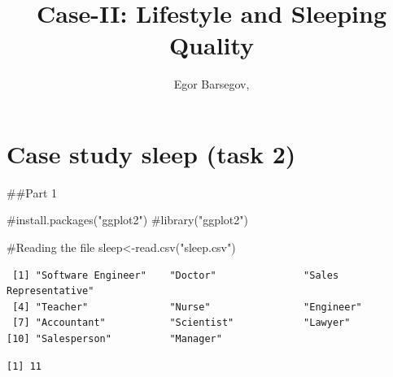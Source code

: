 \documentclass[
  letterpaper,
  DIV=11,
  numbers=noendperiod]{scrartcl}
\title{Case-II: Lifestyle and Sleeping Quality}
\author{Egor Barsegov,}
\date{}
\newenvironment{Shaded}{\begin{snugshade}}{\end{snugshade}}
\newcommand{\CommentTok}[1]{\textcolor[rgb]{0.37,0.37,0.37}{#1}}
\newcommand{\FunctionTok}[1]{\textcolor[rgb]{0.28,0.35,0.67}{#1}}
\newcommand{\NormalTok}[1]{\textcolor[rgb]{0.00,0.23,0.31}{#1}}
\newcommand{\OtherTok}[1]{\textcolor[rgb]{0.00,0.23,0.31}{#1}}
\newcommand{\SpecialCharTok}[1]{\textcolor[rgb]{0.37,0.37,0.37}{#1}}
\newcommand{\StringTok}[1]{\textcolor[rgb]{0.13,0.47,0.30}{#1}}
\begin{document}
\maketitle


\section{Case study sleep (task 2)}\label{case-study-sleep-task-2}

\#\#Part 1

\begin{Shaded}
\begin{Highlighting}[]
\CommentTok{\#install.packages("ggplot2")}
\CommentTok{\#library("ggplot2")}
\end{Highlighting}
\end{Shaded}

\begin{Shaded}
\begin{Highlighting}[]
\CommentTok{\#Reading the file }
\NormalTok{sleep}\OtherTok{\textless{}{-}}\FunctionTok{read.csv}\NormalTok{(}\StringTok{"sleep.csv"}\NormalTok{)}
\end{Highlighting}
\end{Shaded}

\begin{Shaded}
\end{Shaded}

\begin{verbatim}
 [1] "Software Engineer"    "Doctor"               "Sales Representative"
 [4] "Teacher"              "Nurse"                "Engineer"            
 [7] "Accountant"           "Scientist"            "Lawyer"              
[10] "Salesperson"          "Manager"             
\end{verbatim}

\begin{Shaded}
\end{Shaded}

\begin{verbatim}
[1] 11
\end{verbatim}
\end{document}
